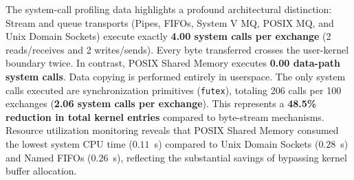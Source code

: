 The system-call profiling data highlights a profound architectural distinction:
Stream and queue transports (Pipes, FIFOs, System V MQ, POSIX MQ, and Unix Domain Sockets) execute exactly \textbf{4.00 system calls per exchange} (2 reads/receives and 2 writes/sends). Every byte transferred crosses the user-kernel boundary twice.
In contrast, POSIX Shared Memory executes \textbf{0.00 data-path system calls}. Data copying is performed entirely in userspace. The only system calls executed are synchronization primitives (\texttt{futex}), totaling 206 calls per 100 exchanges (\textbf{2.06 system calls per exchange}). This represents a \textbf{48.5\% reduction in total kernel entries} compared to byte-stream mechanisms.
Resource utilization monitoring reveals that POSIX Shared Memory consumed the lowest system CPU time ($0.11$~s) compared to Unix Domain Sockets ($0.28$~s) and Named FIFOs ($0.26$~s), reflecting the substantial savings of bypassing kernel buffer allocation.
